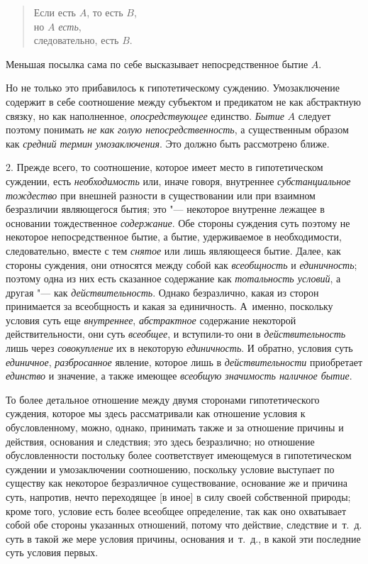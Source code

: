 \begin{verse}
Если есть $A$, то есть $B$,\\
но $A$ {\em есть},\\
следовательно, есть $B$.
\end{verse}

Меньшая посылка сама по себе высказывает непосредственное бытие $A$.

Но не только это прибавилось к гипотетическому суждению.
Умозаключение содержит в себе соотношение между субъектом и предикатом не
как абстрактную связку, но как наполненное, {\em опосредствующее}
единство. {\em Бытие} $A$ следует поэтому понимать
{\em не как голую непосредственность}, а существенным образом как
{\em средний термин умозаключения}. Это должно быть рассмотрено ближе.

2. Прежде всего, то соотношение, которое имеет место в
гипотетическом суждении, есть {\em необходимость} или,
иначе говоря, внутреннее {\em субстанциальное тождество}
при внешней разности в существовании или при
взаимном безразличии являющегося бытия; это "--- некоторое
внутренне лежащее в основании тождественное {\em содержание}. Обе
стороны суждения суть поэтому не некоторое непосредственное бытие, а бытие,
удерживаемое в необходимости, следовательно, вместе с тем {\em снятое} или лишь
являющееся бытие. Далее, как стороны суждения, они относятся между собой
как {\em всеобщность} и {\em единичность};
поэтому одна из них есть сказанное содержание как
{\em тотальность условий}, а другая "--- как {\em действительность}.
Однако безразлично, какая из сторон принимается за
всеобщность и какая за единичность. А~именно, поскольку условия суть еще
{\em внутреннее}, {\em абстрактное}
содержание некоторой действительности, они суть
{\em всеобщее}, и вступили-то они в {\em действительность}
лишь через {\em совокупление} их в некоторую {\em единичность}.
И обратно, условия суть {\em единичное}, {\em разбросанное}
явление, которое лишь в {\em действительности} приобретает {\em единство} и
значение, а также имеющее {\em всеобщую значимость наличное бытие}.

То более детальное отношение между двумя сторонами
гипотетического суждения, которое мы здесь рассматривали как отношение
условия к обусловленному, можно, однако, принимать также и за отношение
причины и действия, основания и следствия; это здесь безразлично; но
отношение обусловленности постольку более соответствует имеющемуся в
гипотетическом суждении и умозаключении соотношению, поскольку условие
выступает по существу как некоторое безразличное существование, основание
же и причина суть, напротив, нечто переходящее [в иное] в силу своей
собственной природы; кроме того, условие есть более всеобщее определение,
так как оно охватывает собой обе стороны указанных отношений, потому что
действие, следствие и~т.~д. суть в такой же мере условия причины, основания
и~т.~д., в какой эти последние суть условия первых.

